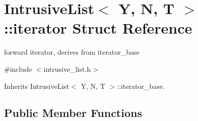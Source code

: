 \hypertarget{structIntrusiveList_1_1iterator}{}\section{Intrusive\+List$<$ Y, N, T $>$\+:\+:iterator Struct Reference}
\label{structIntrusiveList_1_1iterator}


forward iterator, derives from iterator\+\_\+base  




{\ttfamily \#include $<$intrusive\+\_\+list.\+h$>$}



Inherits Intrusive\+List$<$ Y, N, T $>$\+::iterator\+\_\+base.

\subsection*{Public Member Functions}
